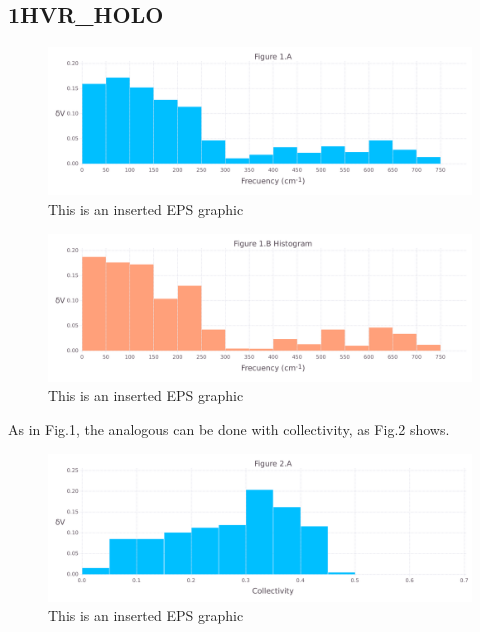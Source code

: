 \documentclass[10pt,letterpaper]{article}
\begin{document}
\FloatBarrier
\newpage

\subsection{1HVR\_HOLO}

\begin{figure}[ht]
\begin{center}
\includegraphics[scale=0.5]{1hvr_hol/1afigure.pdf}
\caption{This is an inserted EPS graphic}
\label{fig1}
\end{center}
\end{figure}

\begin{figure}[ht]
\begin{center}
\includegraphics[scale=0.5]{1hvr_hol/1bfigure.pdf}
\caption{This is an inserted EPS graphic}
\label{fig2}
\end{center}
\end{figure}

\clearpage
As in Fig.1, the analogous can be done with collectivity, as Fig.2 shows.

\begin{figure}[ht]
\begin{center}
\includegraphics[scale=0.5]{1hvr_hol/2afigure.pdf}
\caption{This is an inserted EPS graphic}
\label{fig3}
\end{center}
\end{figure}
\end{document}
